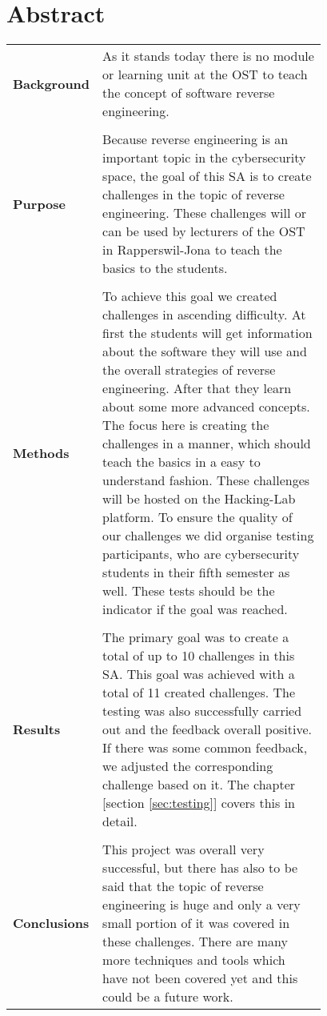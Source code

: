 \chapter{Abstract}
\begin{table}[H]
    \begin{tabular}{lp{0.78\linewidth}}
    \textbf{Background} & As it stands today there is no module or learning unit at the OST to teach the concept of software reverse engineering. \\
    \\
    \textbf{Purpose}    & Because reverse engineering is an important topic in the cybersecurity space, the goal of this SA is to create challenges in the topic of reverse engineering. These challenges will or can be used by lecturers of the OST in Rapperswil-Jona to teach the basics to the students. \\
    \\
    \textbf{Methods}    & To achieve this goal we created challenges in ascending difficulty. At first the students will get information about the software they will use and the overall strategies of reverse engineering. After that they learn about some more advanced concepts. The focus here is creating the challenges in a manner, which should teach the basics in a easy to understand fashion. These challenges will be hosted on the Hacking-Lab platform. To ensure the quality of our challenges we did organise testing participants, who are cybersecurity students in their fifth semester as well. These tests should be the indicator if the goal was reached. \\
    \\
    \textbf{Results}    & The primary goal was to create a total of up to 10 challenges in this SA. This goal was achieved with a total of 11 created challenges. The testing was also successfully carried out and the feedback overall positive. If there was some common feedback, we adjusted the corresponding challenge based on it. The chapter [section \ref{sec:testing}] covers this in detail. \\
    \\
    \textbf{Conclusions} & This project was overall very successful, but there has also to be said that the topic of reverse engineering is huge and only a very small portion of it was covered in these challenges. There are many more techniques and tools which have not been covered yet and this could be a future work. 
    \end{tabular}
    \end{table}
